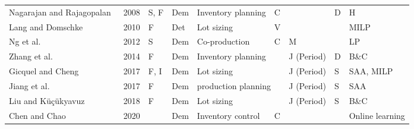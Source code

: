 \documentclass[11pt]{article}
\begin{document}
\begin{table}[]
\begin{adjustbox}{width=1\textwidth,center=\textwidth}
\begin{tabular}{llllllllll}
Nagarajan and Rajagopalan~\cite{nagarajan2008inventory} & 2008                                    & S, F                                 & Dem                               & Inventory planning              & C                   &                              & D              & H                         &              \\
Lang and Domschke~\cite{lang2010efficient}         & 2010                                    & F                                       & Det                               & Lot sizing                      & V                   &                              &                & MILP                        &              \\
Ng et al.~\cite{ng2012robust}              & 2012                                    & S                                       & Dem                               & Co-production                   & C                   & \multicolumn{2}{l}{M}  &                    LP       &              \\
Zhang et al.~\cite{zhang2014branch}             & 2014                                    & F                                       & Dem                               & Inventory planning                      &                     & J (Period)                   & D              & B\&C                      &              \\
Gicquel and Cheng~\cite{gicquel2018joint}         & 2017                                    & F, I                                  & Dem                               & Lot sizing                      &                     & J (Period)                   & S              & SAA, MILP                 &              \\
Jiang et al.~\cite{jiang2017production}              & 2017                                    & F                                       & Dem                               & \multicolumn{2}{l}{production planning}               & J (Period)                   & S              & SAA                       &              \\
Liu and K{\"u}{\c{c}}{\"u}kyavuz~\cite{liu2018polyhedral}          & 2018                                    & F                                       & Dem                               & Lot sizing                      &                     & J (Period)                   & S              & B\&C                      &              \\
Chen and Chao~\cite{chen2020dynamic}             & 2020                                    &                                         & Dem                               & Inventory control               & C                   &                              &                & \multicolumn{2}{l}{Online learning}      \\

\end{tabular}
\end{adjustbox}
\end{table}
\end{document}
